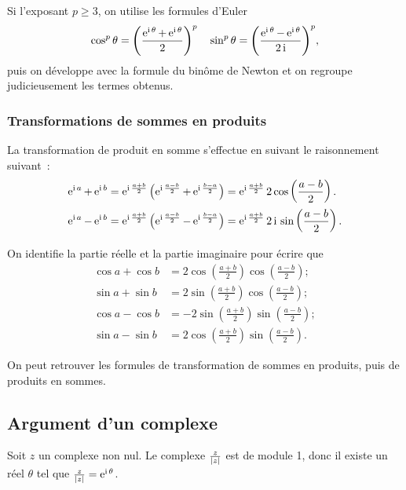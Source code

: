 Si l'exposant \(p \geqslant 3\), on utilise les formules d'Euler
\begin{equation}
  \cos^p{\theta} = {\left(\frac{\operatorname{e}^{\operatorname{i} \theta} + \operatorname{e}^{\operatorname{i} \theta}}{2} \right)}^p
  \quad \sin^p \theta = {\left(\frac{\operatorname{e}^{\operatorname{i} \theta}-\operatorname{e}^{\operatorname{i} \theta}}{2 \operatorname{i}}
  \right)}^p,
\end{equation}
puis on développe avec la formule du binôme de Newton et on regroupe
judicieusement les termes obtenus.

\subsubsection{Transformations de sommes en produits}\label{subsubsec:sommeprod}

La transformation de produit en somme s'effectue en suivant le raisonnement
suivant~:
\begin{align}
  \operatorname{e}^{\operatorname{i} a} + \operatorname{e}^{\operatorname{i} b} &= \operatorname{e}^{\operatorname{i} \frac{a + b}{2}}
  \left( \operatorname{e}^{\operatorname{i} \frac{a-b}{2}} + \operatorname{e}^{\operatorname{i} \frac{b-a}{2}} \right)  =
  \operatorname{e}^{\operatorname{i} \frac{a + b}{2}} 2\cos \left(\frac{a-b}{2} \right).\\
  \operatorname{e}^{\operatorname{i} a}-\operatorname{e}^{\operatorname{i} b} &= \operatorname{e}^{\operatorname{i} \frac{a + b}{2}} \left(
  \operatorname{e}^{\operatorname{i} \frac{a-b}{2}} - \operatorname{e}^{\operatorname{i} \frac{b-a}{2}} \right)
  =  \operatorname{e}^{\operatorname{i} \frac{a + b}{2}} 2 \operatorname{i}{}\sin \left( \frac{a-b}{2} \right).
\end{align}

On identifie la partie réelle et la partie imaginaire pour écrire que
\begin{align}
  \cos a + \cos b &= 2 \cos \left( \frac{a + b}{2} \right) \cos
  \left(\frac{a-b}{2} \right);\\
  \sin a + \sin b &= 2 \sin \left( \frac{a + b}{2} \right) \cos
  \left(\frac{a-b}{2} \right);\\
  \cos a - \cos b &= -2 \sin \left( \frac{a + b}{2} \right) \sin
  \left(\frac{a-b}{2} \right);\\
  \sin a - \sin b &= 2 \cos \left( \frac{a + b}{2} \right) \sin
  \left(\frac{a-b}{2} \right).
\end{align}

On peut retrouver les formules de transformation de sommes en produits, puis de
produits en sommes.

\subsection{Argument d'un complexe}\label{subsec:argumentcomplexe}

Soit \(z\) un complexe non nul. Le complexe \(\frac{z}{\left\lvert z\right\rvert}\) est de module
1, donc il existe un réel \(\theta\) tel que
\(\frac{z}{\left\lvert z\right\rvert} = \operatorname{e}^{\operatorname{i} \theta}\).

